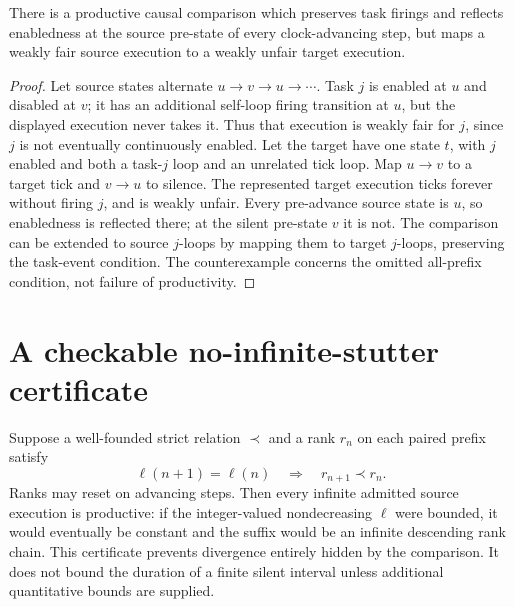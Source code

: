 \documentclass[11pt]{article}
\begin{document}
\begin{proposition}
There is a productive causal comparison which preserves task firings and reflects enabledness at the source pre-state of every clock-advancing step, but maps a weakly fair source execution to a weakly unfair target execution.
\end{proposition}
\begin{proof}
Let source states alternate $u\to v\to u\to\cdots$. Task $j$ is enabled at $u$ and disabled at $v$; it has an additional self-loop firing transition at $u$, but the displayed execution never takes it. Thus that execution is weakly fair for $j$, since $j$ is not eventually continuously enabled. Let the target have one state $t$, with $j$ enabled and both a task-$j$ loop and an unrelated tick loop. Map $u\to v$ to a target tick and $v\to u$ to silence. The represented target execution ticks forever without firing $j$, and is weakly unfair. Every pre-advance source state is $u$, so enabledness is reflected there; at the silent pre-state $v$ it is not. The comparison can be extended to source $j$-loops by mapping them to target $j$-loops, preserving the task-event condition. The counterexample concerns the omitted all-prefix condition, not failure of productivity.
\end{proof}

\section{A checkable no-infinite-stutter certificate}
Suppose a well-founded strict relation $\prec$ and a rank $r_n$ on each paired prefix satisfy
\[
 \ell(n+1)=\ell(n)\quad\Longrightarrow\quad r_{n+1}\prec r_n.
\]
Ranks may reset on advancing steps. Then every infinite admitted source execution is productive: if the integer-valued nondecreasing $\ell$ were bounded, it would eventually be constant and the suffix would be an infinite descending rank chain. This certificate prevents divergence entirely hidden by the comparison. It does not bound the duration of a finite silent interval unless additional quantitative bounds are supplied.
\end{document}
